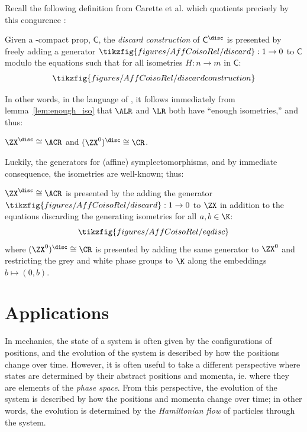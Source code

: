 Recall the following definition from Carette et al. which quotients precisely by this congurence \cite[definition~7]{discard}:
\begin{definition}
Given a \dag-compact prop, \(\mathsf C\), the {\em discard construction} of \(\mathsf{C}^\disc\) is presented by freely adding a generator \(\tikzfig{figures/AffCoisoRel/discard}: 1\to 0\) to \(\mathsf C\) modulo the equations such that for all isometries  \(H:n\to m\) in \(\mathsf C\):
\[\tikzfig{figures/AffCoisoRel/discardconstruction}\]
\end{definition}
In other words, in the language of  \textcite[definition~10]{discard}, it follows immediately from lemma~\ref{lem:enough_iso} that \(\ALR\) and \(\LR\) both have ``enough isometries,'' and thus:
\begin{theorem}
\(\ZX^\disc\cong \ACR\) and \((\ZX^0)^\disc\cong\CR\).
\end{theorem}
Luckily, the generators for (affine) symplectomorphisms, and by immediate consequence, the  isometries are well-known; thus:
\begin{corollary}
\label{cor:disc}
\(\ZX^\disc\cong\ACR\) is presented by the adding the generator \(\tikzfig{figures/AffCoisoRel/discard}: 1\to 0\)  to \(\ZX\) in addition to the equations discarding the generating isometries for all \(a,b\in\K\):
\[\tikzfig{figures/AffCoisoRel/eqdisc}\]
where \((\ZX^0)^\disc\cong\CR\) is presented by adding the same generator to  \(\ZX^0\)  and restricting the grey and white phase groups to \(\K\) along the embeddings \(b \mapsto (0,b)\).
\end{corollary}
\section{Applications}\label{sec:Applications}
In mechanics, the state of a system is often given by the configurations of positions, and the evolution of the system is described by how the positions change over time.  However, it is often useful to take a different perspective where states are determined by their abstract positions and momenta, ie. where they are elements of the {\em phase space}.  From this perspective, the evolution of the system is described by how the positions and momenta change over time; in other words, the evolution is determined by the {\em Hamiltonian flow} of particles through the system.  
